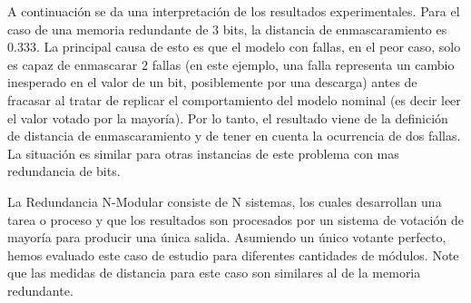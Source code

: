 A continuación se da una interpretación de los resultados experimentales. Para el caso de una memoria redundante de $3$ bits, la distancia de enmascaramiento es $0.333$. La principal causa de esto es que el modelo con fallas, en el peor caso, solo es capaz de enmascarar $2$ fallas (en este ejemplo, una falla representa un cambio inesperado en el valor de un bit, posiblemente por una descarga) antes de fracasar al tratar de replicar el comportamiento del modelo nominal (es decir leer el valor votado por la mayoría). Por lo tanto, el resultado viene de la definición de distancia de enmascaramiento y de tener en cuenta la ocurrencia de dos fallas. La situación es similar para otras instancias de este problema con mas redundancia de bits.

La Redundancia N-Modular consiste de N sistemas, los cuales desarrollan una tarea o proceso y que los resultados son procesados por un sistema de votación de mayoría para producir una única salida. 
Asumiendo un único votante perfecto, hemos evaluado este caso de estudio para diferentes cantidades de módulos.
Note que las medidas de distancia para este caso son similares al de la memoria redundante. 

